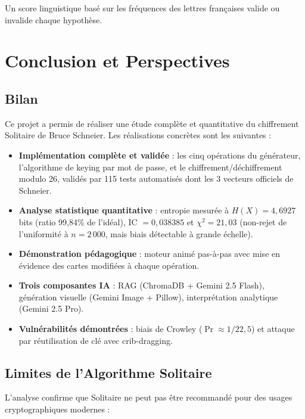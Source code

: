 \documentclass[12pt,a4paper]{article}
\begin{document}
Un score linguistique basé sur les fréquences des lettres françaises valide ou invalide chaque hypothèse.

\section{Conclusion et Perspectives}

\subsection{Bilan}
Ce projet a permis de réaliser une étude complète et quantitative du chiffrement Solitaire de Bruce Schneier. Les réalisations concrètes sont les suivantes :

\begin{itemize}
    \item \textbf{Implémentation complète et validée} : les cinq opérations du générateur, l'algorithme de keying par mot de passe, et le chiffrement/déchiffrement modulo 26, validés par 115 tests automatisés dont les 3 vecteurs officiels de Schneier.
    \item \textbf{Analyse statistique quantitative} : entropie mesurée à $H(X) = 4{,}6927$ bits (ratio 99,84\% de l'idéal), IC $= 0{,}038385$ et $\chi^2 = 21{,}03$ (non-rejet de l'uniformité à $n = 2\,000$, mais biais détectable à grande échelle).
    \item \textbf{Démonstration pédagogique} : moteur animé pas-à-pas avec mise en évidence des cartes modifiées à chaque opération.
    \item \textbf{Trois composantes IA} : RAG (ChromaDB + Gemini 2.5 Flash), génération visuelle (Gemini Image + Pillow), interprétation analytique (Gemini 2.5 Pro).
    \item \textbf{Vulnérabilités démontrées} : biais de Crowley ($\Pr \approx 1/22{,}5$) et attaque par réutilisation de clé avec crib-dragging.
\end{itemize}

\subsection{Limites de l'Algorithme Solitaire}
L'analyse confirme que Solitaire ne peut pas être recommandé pour des usages cryptographiques modernes :
\end{document}
